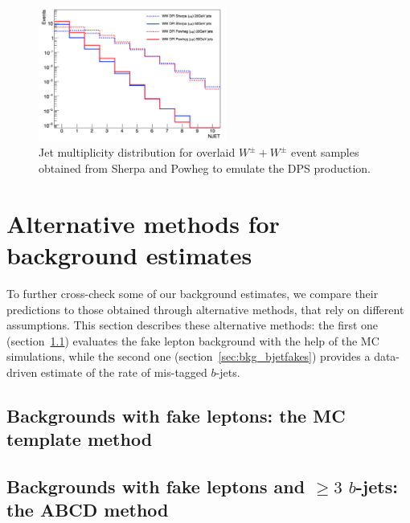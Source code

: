 \begin{figure}[htb!]
\centering
\includegraphics[width=0.55\textwidth]{FIGURES/bckg_MC/Njet_DPS.png}
\caption{\label{fig:DPSWW} Jet multiplicity distribution for overlaid $W^\pm+W^\pm$ event samples obtained from Sherpa and Powheg to emulate the DPS production.}
\end{figure}





\section{Alternative methods for background estimates}
\label{sec:bkg_alternatives}

To further cross-check some of our background estimates, 
we compare their predictions to those obtained through alternative methods, that rely on different assumptions. 
This section describes these alternative methods: 
the first one (section~\ref{sec:bkg_mctemplate_method}) evaluates the fake lepton background with the help of the MC simulations, 
while the second one (section~\ref{sec:bkg_bjetfakes}) provides a data-driven estimate of the rate of mis-tagged $b$-jets. 

\subsection{Backgrounds with fake leptons: the MC template method}
\label{sec:bkg_mctemplate_method}

\clearpage

\subsection{Backgrounds with fake leptons and $\ge 3$ $b$-jets: the ABCD method}
\label{sec:bkg_abcd_method}



